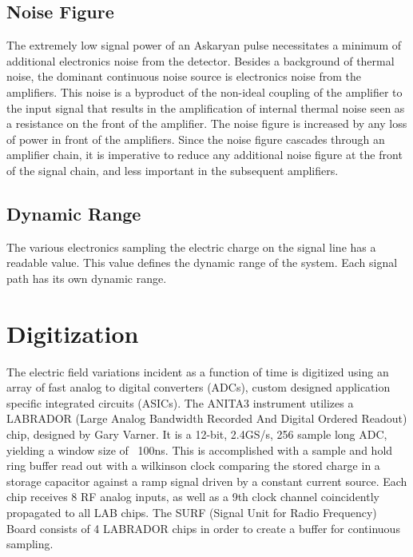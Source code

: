 	\subsection{Noise Figure} 
	The extremely low signal power of an Askaryan pulse necessitates a minimum of additional electronics noise from the detector.  Besides a background of thermal noise, the dominant continuous noise source is electronics noise from the amplifiers.  This noise is a byproduct of the non-ideal coupling of the amplifier to the input signal that results in the amplification of internal thermal noise seen as a resistance on the front of the amplifier.  The noise figure is increased by any loss of power in front of the amplifiers.  Since the noise figure cascades through an amplifier chain, it is imperative to reduce any additional noise figure at the front of the signal chain, and less important in the subsequent amplifiers.
	
	\subsection{Dynamic Range}
	The various electronics sampling the electric charge on the signal line has a readable value.  This value defines the dynamic range of the system.  Each signal path has its own dynamic range.
	
\section{Digitization}
	The electric field variations incident as a function of time is digitized using an array of fast analog to digital converters (ADCs), custom designed application specific integrated circuits (ASICs).  The ANITA3 instrument utilizes a LABRADOR (Large Analog Bandwidth Recorded And Digital Ordered Readout) chip, designed by Gary Varner.  It is a 12-bit, 2.4GS/s, 256 sample long ADC, yielding a window size of ~100ns.  This is accomplished with a sample and hold ring buffer read out with a wilkinson clock comparing the stored charge in a storage capacitor against a ramp signal driven by a constant current source.  Each chip receives 8 RF analog inputs, as well as a 9th clock channel coincidently propagated to all LAB chips.  The SURF (Signal Unit for Radio Frequency) Board consists of 4 LABRADOR chips in order to create a buffer for continuous sampling.  
